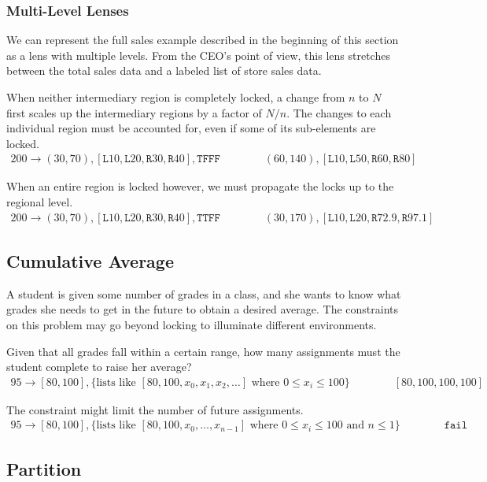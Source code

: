 \documentclass{article}
\newcommand\F{\texttt F}
\newcommand\T{\texttt T}
\renewcommand\L{\texttt L}
\newcommand\R{\texttt R}
\newcommand\Fail{\texttt{fail}}
\newcommand\form[4]{#1 \rightarrow #2, #3 \qquad \qquad #4}
\begin{document}
\subsubsection*{Multi-Level Lenses}
We can represent the full sales example described in the beginning of
this section as a lens with multiple levels. From the CEO's point of
view, this lens stretches between the total sales data and a labeled
list of store sales data. 

When neither intermediary region is completely locked, a change from
$n$ to $N$ first scales up the intermediary regions by a factor of
$N/n$. The changes to each individual region must be accounted for,
even if some of its sub-elements are locked.
\begin{align}
    \form {200} {(30,70),[\L10,\L20,\R30,\R40]} {\T\F\F\F} 
          {(60,140),[\L10,\L50,\R60,\R80]}
\end{align}

When an entire region is locked however, we must propagate the locks
up to the regional level.
\begin{align}
    \form {200} {(30,70),[\L10,\L20,\R30,\R40]} {\T\T\F\F}
          {(30,170),[\L10,\L20,\R72.9,\R97.1]}
\end{align}

\subsection*{Cumulative Average}

A student is given some number of grades in a class, and she wants
to know what grades she needs to get in the future to obtain 
a desired average. The constraints on this problem may go beyond
locking to illuminate different environments. 

Given that all grades fall within a certain range, how many assignments
must the student complete to raise her average?
\begin{align}
    \form {95} {[80,100]} 
    {\{\text{lists like $[80,100,x_0,x_1,x_2,\ldots]$ where
      $0 \le x_i \le 100$}\}}
    {[80,100,100,100]}
\end{align}

The constraint might limit the number of future assignments.
\begin{align}
    \form {95} {[80,100]} 
    {\{\text{lists like $[80,100,x_0,\ldots,x_{n-1}]$ where
      $0 \le x_i \le 100$ and $n\le1$}\}}
    {\Fail}
\end{align}

\subsection*{Partition}
\end{document}
